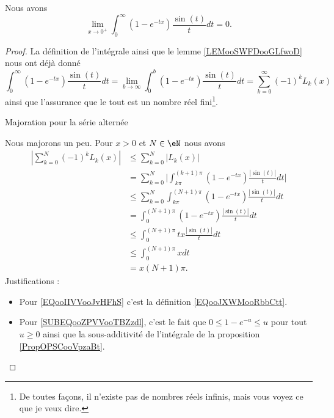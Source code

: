\begin{lemma}       \label{LEMooNZVSooDbZCZx}
    Nous avons
    \begin{equation}
        \lim_{x\to 0^+} \int_0^{\infty}(1- e^{-tx})\frac{ \sin(t) }{ t }dt=0.
    \end{equation}
\end{lemma}

\begin{proof}
    La définition de l'intégrale ainsi que le lemme \ref{LEMooSWFDooGLfwoD} nous ont déjà donné
    \begin{equation}
        \int_0^{\infty}(1- e^{-tx})\frac{ \sin(t) }{ t }dt=\lim_{b\to \infty} \int_0^b(1- e^{-tx})\frac{ \sin(t) }{ t }dt=\sum_{k=0}^{\infty}(-1)^kL_k(x)
    \end{equation}
    ainsi que l'assurance que le tout est un nombre réel fini\footnote{De toutes façons, il n'existe pas de nombres réels infinis, mais vous voyez ce que je veux dire.}.

    \begin{subproof}
        \item[Majoration pour la série alternée]

            Nous majorons un peu. Pour \( x>0\) et \( N\in \eN\) nous avons
            \begin{subequations}        \label{SUBEQSQooLIGNooNAzpmi}
                \begin{align}
                    | \sum_{k=0}^N(-1)^kL_k(x) |&\leq \sum_{k=0}^N| L_k(x) |\\
                    &=\sum_{k=0}^N\big|   \int_{k\pi}^{(k+1)\pi}(1- e^{-tx})\frac{ | \sin(t) | }{ t }dt   \big| \label{EQooIIVVooJvHFhS}\\
                    &\leq \sum_{k=0}^N\int_{k\pi}^{(N+1)\pi}(1- e^{-tx})\frac{ | \sin(t) | }{ t }dt\\
                    &=\int_0^{(N+1)\pi}(1- e^{-tx})\frac{ | \sin(t) | }{ t }dt\\
                    &\leq \int_0^{(N+1)\pi}tx\frac{ | \sin(t) | }{ t }dt    \label{SUBEQooZPVVooTBZzdl}\\
                    &\leq \int_0^{(N+1)\pi}xdt\\
                    &=x(N+1)\pi.
                \end{align}
            \end{subequations}
            Justifications :
            \begin{itemize}
                \item Pour \eqref{EQooIIVVooJvHFhS} c'est la définition \eqref{EQooJXWMooRbbCtt}.
                \item Pour \eqref{SUBEQooZPVVooTBZzdl}, c'est le fait que \( 0\leq 1- e^{-u}\leq u\) pour tout \( u\geq 0\) ainsi que la sous-additivité de l'intégrale de la proposition \ref{PropOPSCooVpzaBt}.
            \end{itemize}


\end{subproof}
\end{proof}
